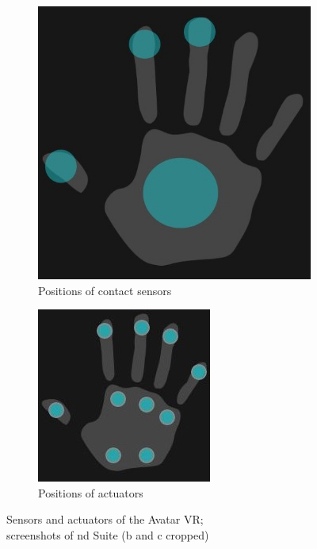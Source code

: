 \documentclass[hyperref, bachelorofscience]{cgvpub}
\begin{document}
\begin{figure}
	\vspace{.2cm}
	\begin{subfigure}{.45\linewidth}
		\includegraphics[width=\linewidth]{../pics/av_contacts}
		\caption{Positions of contact sensors}
		\label{fig:av_tech:contacts}
	\end{subfigure}
	\hspace{.3cm}
	\begin{subfigure}{.45\linewidth}
		\includegraphics[width=\linewidth]{../pics/av_actu}
		\caption{Positions of actuators}
		\label{fig:av_tech:actuators}
	\end{subfigure}
	\caption{Sensors and actuators of the Avatar VR;\\screenshots of \acrshort{nd} Suite (b and c cropped)}
\end{figure}
\end{document}
